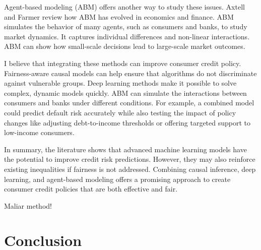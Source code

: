 \documentclass[acmsmall]{acmart}
\begin{document}
Agent-based modeling (ABM) offers another way to study these issues. Axtell and Farmer \cite{Axtell2022} review how ABM has evolved in economics and finance. ABM simulates the behavior of many agents, such as consumers and banks, to study market dynamics. It captures individual differences and non-linear interactions. ABM can show how small-scale decisions lead to large-scale market outcomes.

I believe that integrating these methods can improve consumer credit policy. Fairness-aware causal models can help ensure that algorithms do not discriminate against vulnerable groups. Deep learning methods make it possible to solve complex, dynamic models quickly. ABM can simulate the interactions between consumers and banks under different conditions. For example, a combined model could predict default risk accurately while also testing the impact of policy changes like adjusting debt-to-income thresholds or offering targeted support to low-income consumers.

In summary, the literature shows that advanced machine learning models have the potential to improve credit risk predictions. However, they may also reinforce existing inequalities if fairness is not addressed. Combining causal inference, deep learning, and agent-based modeling offers a promising approach to create consumer credit policies that are both effective and fair.



Maliar method! \cite{maliar2021deep}

\section{Conclusion}





\end{document}
